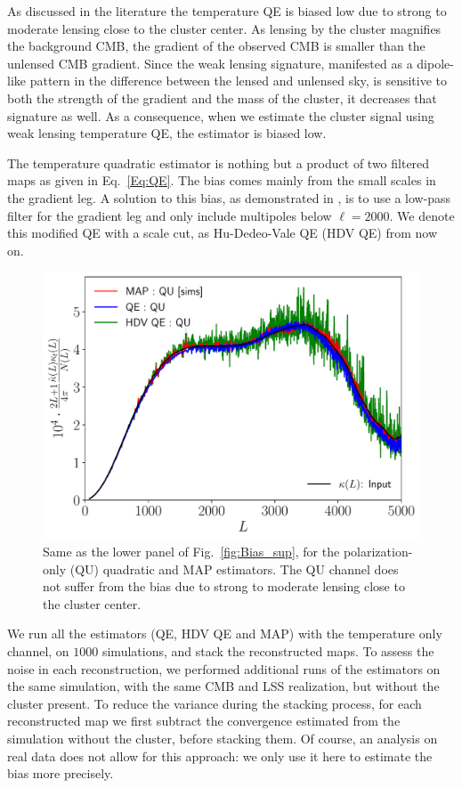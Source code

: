 \documentclass[prd, superscriptaddress, tightenlines, longbibliography, nofootinbib, eqsecnum, amsfonts, amsmath, floatfix, twocolumn, notitlepage]{revtex4-2}
\begin{document}
As discussed in the literature \cite{Maturi:2004zj, Hu:2007bt} the temperature QE is biased low due to strong to moderate lensing close to the cluster center. 
As lensing by the cluster magnifies the background CMB, the gradient of the observed CMB is smaller than the unlensed CMB gradient.
Since the weak lensing signature, manifested as a dipole-like pattern in the difference between the lensed and unlensed sky, is sensitive to both the strength of the gradient and the mass of the cluster, it decreases that signature as well.
As a consequence, when we estimate the cluster signal using weak lensing temperature QE, the estimator is biased low.

The temperature quadratic estimator is nothing but a product of two filtered maps as given in Eq.~\ref{Eq:QE}. The bias comes mainly from the small scales in the gradient leg. 
A solution to this bias, as demonstrated in \cite{Hu:2007bt}, is to use a low-pass filter for the gradient leg and only include multipoles below $\ell=2000$. We denote this modified QE with a scale cut, as Hu-Dedeo-Vale QE (HDV QE) from now on.
\begin{figure}
	\includegraphics[width=0.95\hsize]{Figures/biascomp_QU}
	\caption{Same as the lower panel of Fig.~\ref{fig:Bias_sup}, for the polarization-only (QU) quadratic and MAP estimators. The QU channel does not suffer from the bias due to strong to moderate lensing close to the cluster center.}
	\label{fig:bias_sup_QU}
\end{figure}

We run all the estimators (QE, HDV QE and MAP) with the temperature only channel, on $1000$ simulations, and stack the reconstructed maps.
To assess the noise in each reconstruction, we performed additional runs of the estimators on the same simulation, with the same CMB and LSS realization, but without the cluster present. To reduce the variance during the stacking process, for each reconstructed map we first subtract the convergence estimated from the simulation without the cluster, before stacking them. Of course, an analysis on real data does not allow for this approach: we only use it here to estimate the bias more precisely.
\end{document}
